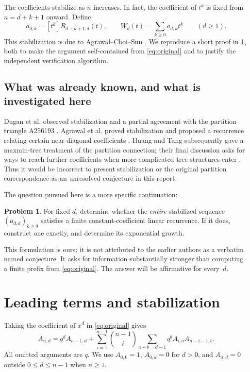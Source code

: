 \documentclass[11pt,letterpaper]{article}
\numberwithin{equation}{section}
\theoremstyle{definition}
\newtheorem{problem}[theorem]{Problem}
\theoremstyle{remark}
\begin{document}
The coefficients stabilize as $n$ increases. In fact, the coefficient of
$t^k$ is fixed from $n=d+k+1$ onward. Define
\begin{equation}\label{eq:Wdefinition}
 a_{d,k}=[t^k]R_{d+k+1,d}(t),\qquad
 W_d(t)=\sum_{k\ge0}a_{d,k}t^k\qquad(d\ge1).
\end{equation}
This stabilization is due to Agrawal--Choi--Sun \cite{ACS}.
We reproduce a short proof in \cref{sec:stabilization}, both to make the
argument self-contained from \eqref{eq:original} and to justify the
independent verification algorithm.

\subsection{What was already known, and what is investigated here}
Dugan et al. observed stabilization and a partial agreement with the
partition triangle A256193 \cite[Section 6.12]{DGGs}. Agrawal et al. proved
stabilization and proposed a recurrence relating certain near-diagonal
coefficients \cite[Section 6]{ACS}. Huang and Tang subsequently gave a
maxmin-tree treatment of the partition connection; their final discussion
asks for ways to reach further coefficients when more complicated tree
structures enter \cite[Section 5]{HT}. Thus it would be incorrect to
present stabilization or the original partition correspondence as an
unresolved conjecture in this report.

The question pursued here is a more specific continuation:
\begin{problem}\label{prob:whole}
For fixed $d$, determine whether the \emph{entire} stabilized sequence
$(a_{d,k})_{k\ge0}$ satisfies a finite constant-coefficient linear
recurrence. If it does, construct one exactly, and determine its
exponential growth.
\end{problem}
This formulation is ours; it is not attributed to the earlier authors
as a verbatim named conjecture. It asks for information substantially
stronger than computing a finite prefix from \eqref{eq:original}.
The answer will be affirmative for every~$d$.

\section{Leading terms and stabilization}\label{sec:stabilization}
Taking the coefficient of $x^d$ in \eqref{eq:original} gives
\begin{equation}\label{eq:Arecurrence}
 A_{n,d}=q^d A_{n-1,d}
 +\sum_{i=1}^{n-1}\binom{n-1}{i}
       \sum_{a+b=d-1}q^b A_{i,a}A_{n-i-1,b}.
\end{equation}
All omitted arguments are $q$. We use $A_{0,0}=1$, $A_{0,d}=0$ for $d>0$,
and $A_{n,d}=0$ outside $0\le d\le n-1$ when $n\ge1$.
\end{document}
